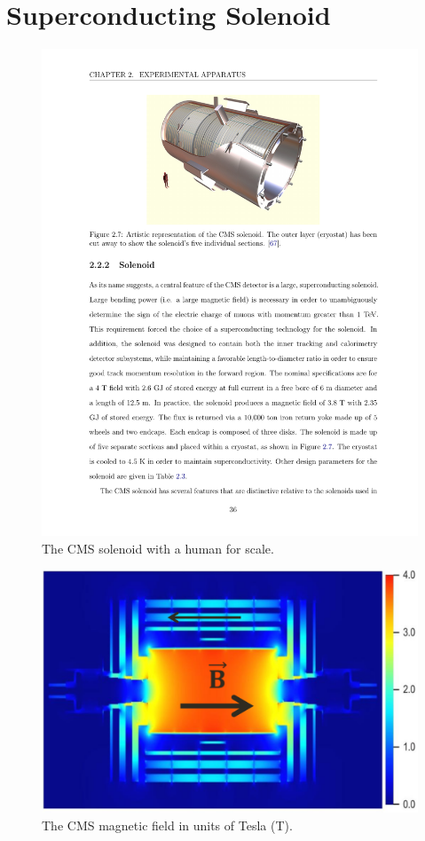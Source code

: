 \section{Superconducting Solenoid}

\begin{figure}
\begin{center}
\includegraphics[width=.65\textwidth]{pics/solenoid_diagram}
\end{center}
\caption{The CMS solenoid with a human for scale.}
\label{fig:solenoid}
\end{figure}

\begin{figure}
\begin{center}
\includegraphics[width=.65\textwidth]{pics/b_field}
\end{center}
\caption{The CMS magnetic field in units of Tesla (T).}
\label{fig:solenoid_bfield}
\end{figure}

